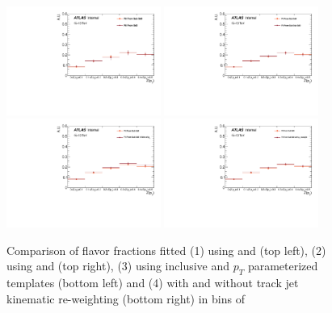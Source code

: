 \begin{figure}[htbp]
  \centering
 \includegraphics[width=0.45\textwidth]{figures/gbb/Sub_Sd0_Fits/Canv_ZpT_leadCrossCheck.pdf}
 \includegraphics[width=0.45\textwidth]{figures/gbb/Sub_Sd0_Fits/Canv_ZpT_subsubCrossCheck.pdf}\\
 \includegraphics[width=0.45\textwidth]{figures/gbb/Sub_Sd0_Fits/Canv_ZpT_ptbinCrossCheck.pdf}
 \includegraphics[width=0.45\textwidth]{figures/gbb/Sub_Sd0_Fits/Canv_ZpT_noreweightCrossCheck.pdf}\\
\caption{Comparison of flavor fractions fitted (1) using \subsdzero and \sdzero (top left), (2) using \subsdzero and \subsubsdzero (top right), (3) using inclusive and $p_T$ parameterized templates (bottom left) and (4) with and without track jet kinematic re-weighting (bottom right) in bins of \zpt}
  \label{fig:ZpT-fitfrac-crosscheck}
\end{figure}


